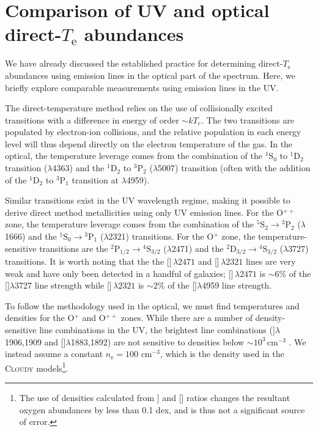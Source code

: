 \documentclass[trackchanges, preprint2]{aastex62}
\newcommand{\Cloudy}{\textsc{Cloudy}\xspace}
\newcommand{\oiii}{[\ion{O}{3}]}
\newcommand{\oii}{[\ion{O}{2}]}
\newcommand{\SiuIII}{[\ion{Si}{3}]}
\newcommand{\ciii}{\ion{C}{3}]}
\newcommand{\Te}{\ensuremath{T_{\mathrm{e}}}\xspace}
\begin{document}
\section{Comparison of UV and optical direct-\Te abundances}\label{appdx:UVdirectTe}

We have already discussed the established practice for determining direct-\Te abundances using emission lines in the optical part of the spectrum. Here, we briefly explore comparable measurements using emission lines in the UV.

The direct-temperature method relies on the use of collisionally excited transitions with a difference in energy of order ${\sim}k T_{e}$. The two transitions are populated by electron-ion collisions, and the relative population in each energy level will thus depend directly on the electron temperature of the gas. In the optical, the temperature leverage comes from the combination of the ${}^1 \mathrm{S}_0$ to ${}^1 \mathrm{D}_2$ transition ($\lambda$4363) and the  ${}^1 \mathrm{D}_2$ to ${}^3 \mathrm{P}_2$ ($\lambda$5007) transition (often with the addition of the ${}^1\mathrm{D}_2$ to $^3\mathrm{P}_1$ transition at $\lambda$4959).

Similar transitions exist in the UV wavelength regime, making it possible to derive direct method metallicities using only UV emission lines. For the O$^{++}$ zone, the temperature leverage comes from the combination of the ${}^5 \mathrm{S}_2 \rightarrow {}^3 \mathrm{P}_2$ ($\lambda$1666) and the ${}^1 \mathrm{S}_0 \rightarrow {}^3 \mathrm{P}_1$ ($\lambda$2321) transitions. For the O$^{+}$ zone, the temperature-sensitive transitions are the ${}^2 \mathrm{P}_{1/2} \rightarrow {}^4 \mathrm{S}_{3/2}$ ($\lambda$2471) and the ${}^2 \mathrm{D}_{3/2} \rightarrow {}^4 \mathrm{S}_{3/2}$ ($\lambda$3727) transitions. It is worth noting that the the \oii$\,\lambda2471$ and \oiii$\,\lambda2321$ lines are very weak and have only been detected in a handful of galaxies; \oii$\,\lambda2471$ is ${\sim}6$\% of the \oii$\lambda$3727 line strength while \oiii$\,\lambda2321$ is ${\sim}2$\% of the \oiii$\lambda$4959 line strength.

To follow the methodology used in the optical, we must find temperatures and densities for the O$^{+}$ and O$^{++}$ zones. While there are a number of density-sensitive line combinations in the UV, the brightest line combinations (\ciii$\lambda$1906,1909 and \SiuIII$\lambda$1883,1892) are not sensitive to densities below $\sim10^3\,$cm$^{-3}$ \citep{Berg+2019}. We instead assume a constant $n_{\mathrm{e}} = 100$ cm$^{-3}$, which is the density used in the \Cloudy models\footnote{The use of densities calculated from \ciii{} and \SiuIII{} ratios changes the resultant oxygen abundances by less than 0.1 dex, and is thus not a significant source of error.}.
\end{document}
